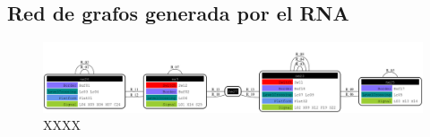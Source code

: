 \subsection{Red de grafos generada por el RNA}

 \lipsum[1]

\begin{figure}[H]
	\centering
	\includegraphics[width=1\textwidth]{Figuras/Graph_8}
	\centering\caption{XXXX}
\end{figure}

\lipsum[1]